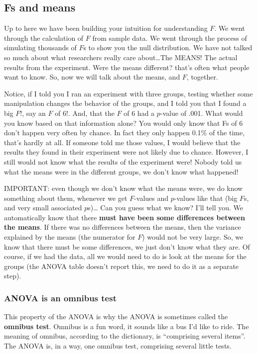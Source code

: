 \documentclass[
  letterpaper,
  DIV=11,
  numbers=noendperiod]{scrreprt}
\begin{document}
\subsection{Fs and means}\label{fs-and-means}

Up to here we have been building your intuition for understanding \(F\).
We went through the calculation of \(F\) from sample data. We went
through the process of simulating thousands of \(F\)s to show you the
null distribution. We have not talked so much about what researchers
really care about\ldots The MEANS! The actual results from the
experiment. Were the means different? that's often what people want to
know. So, now we will talk about the means, and \(F\), together.

Notice, if I told you I ran an experiment with three groups, testing
whether some manipulation changes the behavior of the groups, and I told
you that I found a big \(F\)!, say an \(F\) of 6!. And, that the \(F\)
of 6 had a \(p\)-value of .001. What would you know based on that
information alone? You would only know that Fs of 6 don't happen very
often by chance. In fact they only happen 0.1\% of the time, that's
hardly at all. If someone told me those values, I would believe that the
results they found in their experiment were not likely due to chance.
However, I still would not know what the results of the experiment were!
Nobody told us what the means were in the different groups, we don't
know what happened!

IMPORTANT: even though we don't know what the means were, we do know
something about them, whenever we get \(F\)-values and \(p\)-values like
that (big \(F\)s, and very small associated \(p\)s)\ldots{} Can you
guess what we know? I'll tell you. We automatically know that there
\textbf{must have been some differences between the means}. If there was
no differences between the means, then the variance explained by the
means (the numerator for \(F\)) would not be very large. So, we know
that there must be some differences, we just don't know what they are.
Of course, if we had the data, all we would need to do is look at the
means for the groups (the ANOVA table doesn't report this, we need to do
it as a separate step).

\subsubsection{ANOVA is an omnibus test}\label{anova-is-an-omnibus-test}

This property of the ANOVA is why the ANOVA is sometimes called the
\textbf{omnibus test}. Omnibus is a fun word, it sounds like a bus I'd
like to ride. The meaning of omnibus, according to the dictionary, is
``comprising several items''. The ANOVA is, in a way, one omnibus test,
comprising several little tests.
\end{document}
